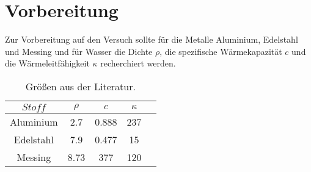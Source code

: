 \section{Vorbereitung} \label{sec:vorbereitung}

    Zur Vorbereitung auf den Versuch sollte für die Metalle
    Aluminium, Edelstahl und Messing und für Wasser die Dichte $\rho$,
    die spezifische Wärmekapazität $c$ und die Wärmeleitfähigkeit $\kappa$ 
    recherchiert werden.

   \begin{table}
        \centering
        \caption{Größen aus der Literatur.}
        \label{tab:daten_vorbereitung}
        \begin{tabular}{c c c c c}
         \toprule
         $Stoff$ & $\rho$ & $c$ & $\kappa$ \\
         \midrule
         Aluminium & 2.7 & 0.888 & 237 \\ %
         Edelstahl & 7.9 & 0.477 & 15 \\ %
         Messing & 8.73 & 377 & 120 \\ %
         \bottomrule
        \end{tabular}
   \end{table}